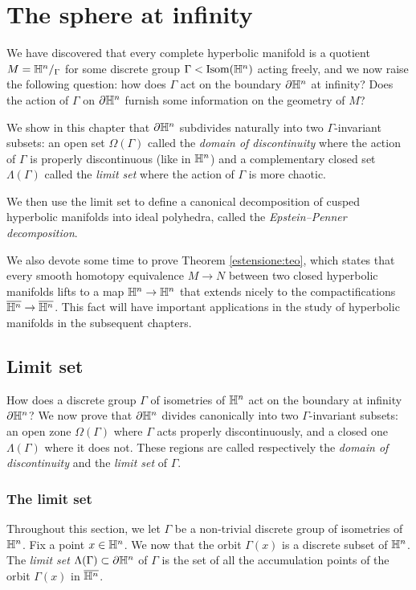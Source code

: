 \chapter{The sphere at infinity} \label{infinity:chapter}
We have discovered that every complete hyperbolic manifold is a quotient $M=\mathbb{H}^n/_\Gamma$ for some discrete group $\Gamma < {\rm Isom}(\mathbb{H}^n)$ acting freely, and we now raise the following question: how does $\Gamma$ act on the boundary $\partial \mathbb{H}^n$ at infinity? Does the action of $\Gamma$ on $\partial \mathbb{H}^n$ furnish some information on the geometry of $M$?

We show in this chapter that $\partial \mathbb{H}^n$ subdivides naturally into two $\Gamma$-invariant subsets: an open set $\Omega(\Gamma)$ called the \emph{domain of discontinuity} where the action of $\Gamma$ is properly discontinuous (like in $\mathbb{H}^n$) and a complementary closed set $\Lambda(\Gamma)$ called the \emph{limit set} where the action of $\Gamma$ is more chaotic.

We then use the limit set to define a canonical decomposition of cusped hyperbolic manifolds into ideal polyhedra, called the \emph{Epstein--Penner decomposition}.

We also devote some time to prove Theorem \ref{estensione:teo}, which states that every smooth homotopy equivalence $M\to N$ between two closed hyperbolic manifolds lifts to a map $\mathbb{H}^n \to \mathbb{H}^n$ that extends nicely to the compactifications $\overline{\mathbb{H}^n}\to\overline{\mathbb{H}^n}$. This fact will have important applications in the study of hyperbolic manifolds in the subsequent chapters.

\section{Limit set}
How does a discrete group $\Gamma $ of isometries of $\mathbb{H}^n$ act on the boundary at infinity $\partial \mathbb{H}^n$? We now prove that $\partial \mathbb{H}^n$ divides canonically into two $\Gamma$-invariant subsets: an open zone $\Omega(\Gamma)$ where $\Gamma$ acts properly discontinuously, and a closed one $\Lambda(\Gamma)$ where it does not. These regions are called respectively the \emph{domain of discontinuity} and the \emph{limit set} of $\Gamma$. 

\subsection{The limit set}
Throughout this section, we let $\Gamma$ be a non-trivial discrete group of isometries of $\mathbb{H}^n$. Fix a point $x\in\mathbb{H}^n$. We now that the orbit $\Gamma(x)$ is a discrete subset of $\mathbb{H}^n$. The \emph{limit set} $\Lambda (\Gamma)\subset \partial \mathbb{H}^n$ of $\Gamma$ is the set of all the accumulation points of the orbit $\Gamma(x)$ in $\overline{\mathbb{H}^n}$.\index{$\Lambda(\Gamma)$}


